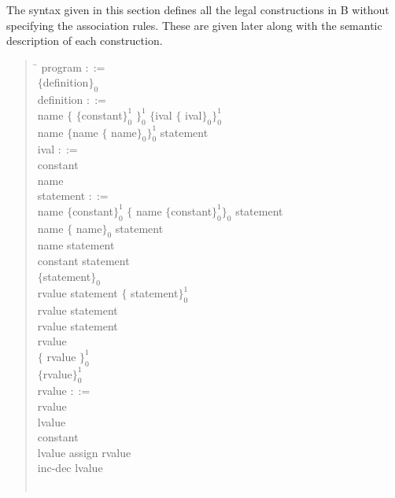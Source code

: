 \documentclass[12pt]{report}
\begin{document}
The syntax given in this section defines all the legal constructions
in B without specifying the association rules. These are given later
along with the semantic description of each construction.
\begin{quote}
  \baselineskip=20pt
  \begin{tabbing}
    \hspace{1cm} \= \kill
  program $::=$ \\
  \> $\{$definition$\}_0^{}$ \\
  definition $::=$ \\
  \> name $\{$ \token{[} $\{$constant$\}_0^1$ \token{]} $\}_0^1$
  $\{$ival $\{$\token{,} ival$\}_0^{}$$\}_0^1$ \token{;} \\
  \> name \token{(} $\{$name $\{$\token{,} name$\}_0^{}\}_0^1$ \token{)}
  statement \\
  ival $::=$ \\
  \> constant \\
  \> name \\
  statement $::=$ \\
  \> 
  name
  $\{$constant$\}_0^1$
  $\{$\token{,} name $\{$constant$\}_0^1\}_0^{}$
  \token{;} statement
  \\
  \> 
  name
  $\{$\token{,} name$\}_0^{}$  
  \token{;} statement
  \\
  \> name \token{:} statement \\
  \>  constant \token{:} statement \\
  \> \token{\{} $\{$statement$\}_0$  \token{\}} \\
  \>  \token{(} rvalue \token{)} statement
  $\{$ statement$\}_0^1$ \\
  \>  \token{(} rvalue \token{)} statement \\
  \>  rvalue statement \\
  \>  rvalue \token{;} \\
  \>  $\{$\token{(} rvalue \token{)}$\}_0^1$ \token{;} \\
  \> $\{$rvalue$\}_0^1$ \token{;} \\
  rvalue $::=$ \\
  \> \token{(} rvalue \token{)} \\
  \> lvalue \\
  \> constant \\
  \> lvalue assign rvalue \\
  \> inc-dec lvalue \\
$$
\end{tabbing}
\end{quote}
\end{document}
